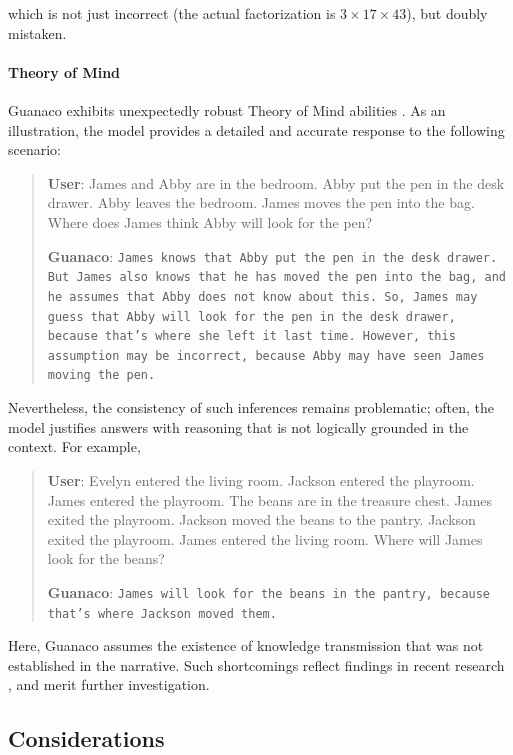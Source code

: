 which is not just incorrect (the actual factorization is $3 \times 17 \times 43$), but doubly mistaken.

\paragraph{Theory of Mind} {Guanaco} exhibits unexpectedly robust Theory of Mind abilities \cite{nematzadeh2018evaluating, sap2022neural}. As an illustration, the model provides a detailed and accurate response to the following scenario:

\begin{quote}
    \textbf{User}: James and Abby are in the bedroom. Abby put the pen in the desk drawer. Abby leaves the bedroom. James moves the pen into the bag. Where does James think Abby will look for the pen?

    \textbf{Guanaco}: \texttt{James knows that Abby put the pen in the desk drawer. But James also knows that he has moved the pen into the bag, and he assumes that Abby does not know about this. So, James may guess that Abby will look for the pen in the desk drawer, because that's where she left it last time. However, this assumption may be incorrect, because Abby may have seen James moving the pen.}
\end{quote}

Nevertheless, the consistency of such inferences remains problematic; often, the model justifies answers with reasoning that is not logically grounded in the context. For example,

\begin{quote}
    \textbf{User}: Evelyn entered the living room. Jackson entered the playroom. James entered the playroom. The beans are in the treasure chest. James exited the playroom. Jackson moved the beans to the pantry. Jackson exited the playroom. James entered the living room. Where will James look for the beans?

    \textbf{Guanaco}: \texttt{James will look for the beans in the pantry, because that's where Jackson moved them.}
\end{quote}

Here, {Guanaco} assumes the existence of knowledge transmission that was not established in the narrative. Such shortcomings reflect findings in recent research \cite{sap2022neural}, and merit further investigation.

\subsection{Considerations}
\label{ssec:considerations}

